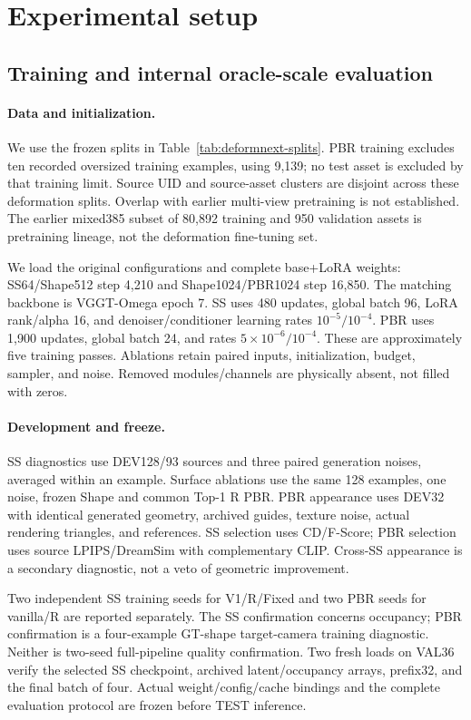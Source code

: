 \section{Experimental setup}


\subsection{Training and internal oracle-scale evaluation}
\paragraph{Data and initialization.}
We use the frozen splits in Table~\ref{tab:deformnext-splits}.
PBR training excludes ten recorded oversized training examples,
using 9,139; no test asset is excluded by that training limit. Source UID and
source-asset clusters are disjoint across these deformation splits. Overlap
with earlier multi-view pretraining is not established. The earlier mixed385
subset of 80,892 training and 950 validation assets is pretraining lineage,
not the deformation fine-tuning set.

We load the original configurations and complete base+LoRA weights:
SS64/Shape512 step 4,210 and Shape1024/PBR1024 step 16,850. The matching backbone
is VGGT-Omega epoch 7. SS uses 480 updates, global batch 96, LoRA rank/alpha 16,
and denoiser/conditioner learning rates $10^{-5}/10^{-4}$. PBR uses 1,900
updates, global batch 24, and rates $5\times10^{-6}/10^{-4}$. These are
approximately five training passes. Ablations retain paired inputs,
initialization, budget, sampler, and noise. Removed modules/channels are
physically absent, not filled with zeros.

\paragraph{Development and freeze.}
SS diagnostics use DEV128/93 sources and three paired generation noises,
averaged within an example. Surface ablations use the same 128 examples,
one noise, frozen Shape and common Top-1 R PBR. PBR appearance uses DEV32
with identical generated geometry, archived guides, texture noise, actual
rendering triangles, and references. SS selection uses CD/F-Score; PBR
selection uses source LPIPS/DreamSim with complementary CLIP. Cross-SS
appearance is a secondary diagnostic, not a veto of geometric improvement.

Two independent SS training seeds for V1/R/Fixed and two PBR seeds for
vanilla/R are reported separately. The SS confirmation concerns occupancy;
PBR confirmation is a four-example GT-shape target-camera training diagnostic.
Neither is two-seed full-pipeline quality confirmation. Two fresh loads on
VAL36 verify the selected SS checkpoint, archived latent/occupancy arrays,
prefix32, and the final batch of four. Actual weight/config/cache bindings
and the complete evaluation protocol are frozen before TEST inference.

